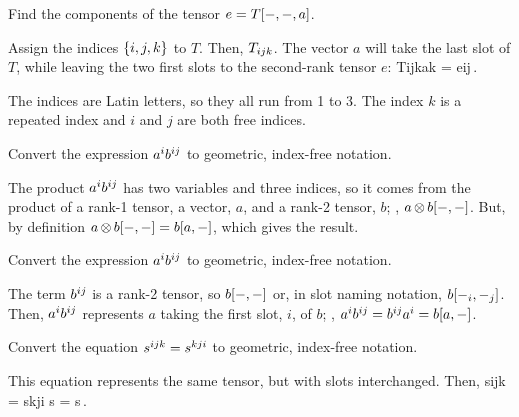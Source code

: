 \begin{example}
Find the components of the tensor $e = T\!\left[{-,-, a}\right]$.
\end{example}

\begin{solution}
Assign the indices $\left\lbrace{i,j,k}\right\rbrace$ to $T$. Then, ${T}_{ijk}$. The vector $a$ will take the last slot of $T$, while leaving the two first slots to the second-rank tensor $e$:
\beq
\cotens T{ijk}\cnvec ak = \covec e{ij}\,.
\eeq

The indices are Latin letters, so they all run from 1 to 3. The index $k$ is a repeated index and $i$ and $j$ are both free indices.
\end{solution}


\begin{example}
Convert the expression ${a}^{i}{b}^{ij}$ to geometric, index-free notation.
\end{example}

\begin{solution}
The product ${a}^{i}{b}^{ij}$ has two variables and three indices, so it comes from the product of a rank-1 tensor, a vector, $a$, and a rank-2 tensor, $b$; \ie, $a\operatorname{\otimes} b\!\left[{-, -}\right]$. But, by definition $a\operatorname{\otimes} b\!\left[{-, -}\right] = b\!\left[{a, -}\right]$, which gives the result.
\end{solution}


\begin{example}
Convert the expression ${a}^{i}{b}^{ij}$ to geometric, index-free notation.
\end{example}

\begin{solution}
The term ${b}^{ij}$ is a rank-2 tensor, so $b\!\left[{-, -}\right]$ or, in slot naming notation, $b\!\left[{-_i, -_j}\right]$. Then, ${a}^{i}{b}^{ij}$ represents $a$ taking the first slot, $i$, of $b$; \ie, ${a}^{i}{b}^{ij} = {b}^{ij}{a}^{i} = b\!\left[{a,-}\right]$.
\end{solution}


\begin{example}
Convert the equation ${s}^{ijk} = {s}^{kji}$ to geometric, index-free notation.
\end{example}

\begin{solution}
This equation represents the same tensor, but with slots interchanged. Then, 
\beq
\cnvec s{ijk} = \cnvec s{kji} \implies 
             s = s\,.\mqed
\eeq
\end{solution}


